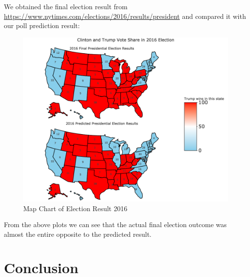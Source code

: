 \documentclass[
  12pt,
]{article}
\begin{document}
We obtained the final election result from
\url{https://www.nytimes.com/elections/2016/results/president} and
compared it with our poll prediction result:

\begin{figure}
\centering
\includegraphics{./Figures/mapchart_3_4.png}
\caption{Map Chart of Election Result 2016}
\end{figure}

From the above plots we can see that the actual final election outcome
was almost the entire opposite to the predicted result.

\hypertarget{conclusion}{%
\section{Conclusion}\label{conclusion}}
\end{document}
